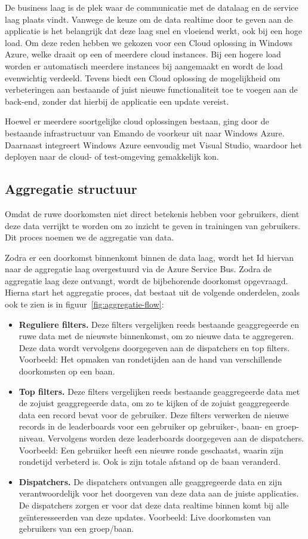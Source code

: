 De business laag is de plek waar de communicatie met de datalaag en de service laag plaats vindt. Vanwege de keuze om de data realtime door te geven aan de applicatie is het belangrijk dat deze laag snel en vloeiend werkt, ook bij een hoge load. Om deze reden hebben we gekozen voor een Cloud oplossing in Windows Azure, welke draait op een of meerdere cloud instances. Bij een hogere load worden er automatisch meerdere instances bij aangemaakt en wordt de load evenwichtig verdeeld. Tevens biedt een Cloud oplossing de mogelijkheid om verbeteringen aan bestaande of juist nieuwe functionaliteit toe te voegen aan de back-end, zonder dat hierbij de applicatie een update vereist.

Hoewel er meerdere soortgelijke cloud oplossingen bestaan, ging door de bestaande infrastructuur van Emando de voorkeur uit naar Windows Azure. Daarnaast integreert Windows Azure eenvoudig met Visual Studio, waardoor het deployen naar de cloud- of test-omgeving gemakkelijk kon.

\subsection{Aggregatie structuur}

Omdat de ruwe doorkomsten niet direct betekenis hebben voor gebruikers, dient deze data verrijkt te worden om zo inzicht te geven in trainingen van gebruikers. Dit proces noemen we de aggregatie van data.

Zodra er een doorkomst binnenkomt binnen de data laag, wordt het Id hiervan naar de aggregatie laag overgestuurd via de Azure Service Bus. Zodra de aggregatie laag deze ontvangt, wordt de bijbehorende doorkomst opgevraagd. Hierna start het aggregatie proces, dat bestaat uit de volgende onderdelen, zoals ook te zien is in figuur~\ref{fig:aggregatie-flow}:

\begin{itemize}
\item \textbf{Reguliere filters.}
Deze filters vergelijken reeds bestaande geaggregeerde en ruwe data met de nieuwste binnenkomst, om zo nieuwe data te aggregeren. Deze data wordt vervolgens doorgegeven aan de dispatchers en top filters. Voorbeeld: Het opmaken van rondetijden aan de hand van verschillende doorkomsten op een baan.
\item \textbf{Top filters.}
Deze filters vergelijken reeds bestaande geaggregeerde data met de zojuist geaggregeerde data, om zo te kijken of de zojuist geaggregeerde data een record bevat voor de gebruiker. Deze filters verwerken de nieuwe records in de leaderboards voor een gebruiker op gebruiker-, baan- en groep-niveau. Vervolgens worden deze leaderboards doorgegeven aan de dispatchers. Voorbeeld: Een gebruiker heeft een nieuwe ronde geschaatst, waarin zijn rondetijd verbeterd is. Ook is zijn totale afstand op de baan veranderd. 
\item \textbf{Dispatchers.}
De dispatchers ontvangen alle geaggregeerde data en zijn verantwoordelijk voor het doorgeven van deze data aan de juiste applicaties. De dispatchers zorgen er voor dat deze data realtime binnen komt bij alle geïnteresseerden van deze updates. 
Voorbeeld: Live doorkomsten van gebruikers van een groep/baan. 
\end{itemize}


